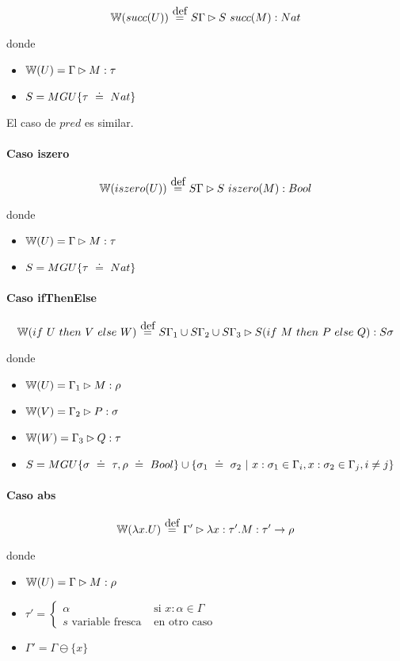 \[\w{succ(U)} \eqdef S\Gamma \rhd S\ succ(M) : Nat\]

donde
\begin{itemize}
  \item $\mathbb{W}(U) = \Gamma \rhd M : \tau$
  \item $S = MGU\{\tau \uni Nat\}$
\end{itemize}

El caso de $pred$ es similar.

\paragraph{Caso iszero}

\[\w{iszero(U)} \eqdef S\Gamma \rhd S\ iszero(M) : Bool\]

donde
\begin{itemize}
  \item $\mathbb{W}(U) = \Gamma \rhd M : \tau$
  \item $S = MGU\{\tau \uni Nat\}$
\end{itemize}

\paragraph{Caso ifThenElse}

\[\w{\ifte{U}{V}{W}} \eqdef S\Gamma_1 \cup S\Gamma_2 \cup S\Gamma_3 \rhd S(\ifte{M}{P}{Q}) : S\sigma\]

donde
\begin{itemize}
  \item $\mathbb{W}(U) = \Gamma_1 \rhd M : \rho$
  \item $\mathbb{W}(V) = \Gamma_2 \rhd P : \sigma$
  \item $\mathbb{W}(W) = \Gamma_3 \rhd Q : \tau$
  \item $S = MGU\{\sigma \uni \tau, \rho \uni Bool\} \cup \{\sigma_1 \uni \sigma_2 \vert x:\sigma_1 \in \Gamma_i, x:\sigma_2 \in \Gamma_j, i\neq j\}$
\end{itemize}

\paragraph{Caso abs}

\[\w{\lambda x.U} \eqdef \Gamma' \rhd \abs{x}{\tau'}{M} : \tau'\to\rho\]

donde
\begin{itemize}
  \item $\mathbb{W}(U) = \Gamma \rhd M : \rho$
  \item $\tau' = \begin{cases}
          \alpha & \text{ si } x:\alpha \in \Gamma \\
          s \text{ variable fresca} &  \text{ en otro caso}
       \end{cases}$
  \item $\Gamma' = \Gamma \ominus \{x\}$
\end{itemize}

